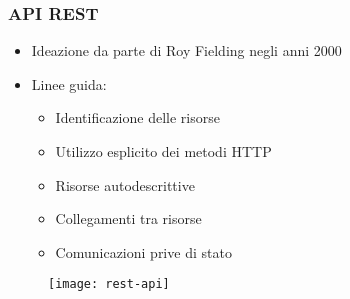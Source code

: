 \begin{frame}
  \frametitle{API REST}

  \begin{itemize}
  \item Ideazione da parte di Roy Fielding negli anni 2000
  \item Linee guida:
    \begin{itemize}
    \item Identificazione delle risorse
    \item Utilizzo esplicito dei metodi HTTP
    \item Risorse autodescrittive
    \item Collegamenti tra risorse
    \item Comunicazioni prive di stato
    \end{itemize}
  \end{itemize}

  \begin{figure}[H]
    \centering
    \texttt{[image: rest-api]}
  \end{figure}
\end{frame}
